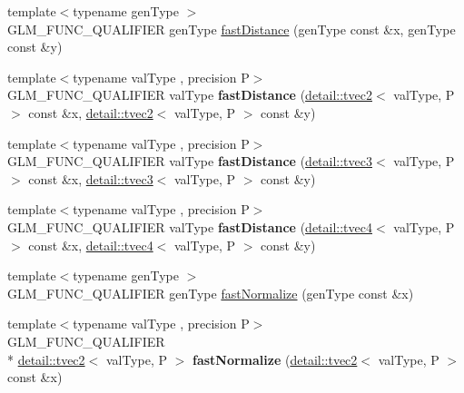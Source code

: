 \begin{DoxyCompactItemize}
\item 
{\footnotesize template$<$typename gen\-Type $>$ }\\G\-L\-M\-\_\-\-F\-U\-N\-C\-\_\-\-Q\-U\-A\-L\-I\-F\-I\-E\-R gen\-Type \hyperlink{group__gtx__fast__square__root_ga69778792fcadc29f586efa3ec2118cdc}{fast\-Distance} (gen\-Type const \&x, gen\-Type const \&y)
\item 
\hypertarget{namespaceglm_abad0f73feba7bba2a34268ea6464ef92}{{\footnotesize template$<$typename val\-Type , precision P$>$ }\\G\-L\-M\-\_\-\-F\-U\-N\-C\-\_\-\-Q\-U\-A\-L\-I\-F\-I\-E\-R val\-Type {\bfseries fast\-Distance} (\hyperlink{structglm_1_1detail_1_1tvec2}{detail\-::tvec2}$<$ val\-Type, P $>$ const \&x, \hyperlink{structglm_1_1detail_1_1tvec2}{detail\-::tvec2}$<$ val\-Type, P $>$ const \&y)}\label{namespaceglm_abad0f73feba7bba2a34268ea6464ef92}

\item 
\hypertarget{namespaceglm_ae821b1d9d6994f4991f8ebeafb762282}{{\footnotesize template$<$typename val\-Type , precision P$>$ }\\G\-L\-M\-\_\-\-F\-U\-N\-C\-\_\-\-Q\-U\-A\-L\-I\-F\-I\-E\-R val\-Type {\bfseries fast\-Distance} (\hyperlink{structglm_1_1detail_1_1tvec3}{detail\-::tvec3}$<$ val\-Type, P $>$ const \&x, \hyperlink{structglm_1_1detail_1_1tvec3}{detail\-::tvec3}$<$ val\-Type, P $>$ const \&y)}\label{namespaceglm_ae821b1d9d6994f4991f8ebeafb762282}

\item 
\hypertarget{namespaceglm_a8aa811e84bd1f8d69f4ff2185ec4e4f2}{{\footnotesize template$<$typename val\-Type , precision P$>$ }\\G\-L\-M\-\_\-\-F\-U\-N\-C\-\_\-\-Q\-U\-A\-L\-I\-F\-I\-E\-R val\-Type {\bfseries fast\-Distance} (\hyperlink{structglm_1_1detail_1_1tvec4}{detail\-::tvec4}$<$ val\-Type, P $>$ const \&x, \hyperlink{structglm_1_1detail_1_1tvec4}{detail\-::tvec4}$<$ val\-Type, P $>$ const \&y)}\label{namespaceglm_a8aa811e84bd1f8d69f4ff2185ec4e4f2}

\item 
{\footnotesize template$<$typename gen\-Type $>$ }\\G\-L\-M\-\_\-\-F\-U\-N\-C\-\_\-\-Q\-U\-A\-L\-I\-F\-I\-E\-R gen\-Type \hyperlink{group__gtx__fast__square__root_ga3b02c1d6e0c754144e2f1e110bf9f16c}{fast\-Normalize} (gen\-Type const \&x)
\item 
\hypertarget{namespaceglm_a5a77e7b85b5e1625b045f168c4c8a68e}{{\footnotesize template$<$typename val\-Type , precision P$>$ }\\G\-L\-M\-\_\-\-F\-U\-N\-C\-\_\-\-Q\-U\-A\-L\-I\-F\-I\-E\-R \\*
\hyperlink{structglm_1_1detail_1_1tvec2}{detail\-::tvec2}$<$ val\-Type, P $>$ {\bfseries fast\-Normalize} (\hyperlink{structglm_1_1detail_1_1tvec2}{detail\-::tvec2}$<$ val\-Type, P $>$ const \&x)}\label{namespaceglm_a5a77e7b85b5e1625b045f168c4c8a68e}


\end{DoxyCompactItemize}
